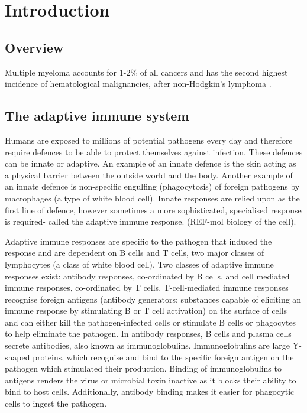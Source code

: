 \chapter{\label{ch:1-intro}Introduction} 


\section{Overview}
Multiple myeloma accounts for 1-2\% of all cancers and has the second highest incidence of hematological malignancies, after non-Hodgkin’s lymphoma \cite{international2003criteria}.

\section{The adaptive immune system}
Humans are exposed to millions of potential pathogens every day and therefore require defences to be able to protect themselves against infection. These defences can be innate or adaptive. An example of an innate defence is the skin acting as a physical barrier between the outside world and the body. Another example of an innate defence is non-specific engulfing (phagocytosis) of foreign pathogens by macrophages (a type of white blood cell). Innate responses are relied upon as the first line of defence, however sometimes a more sophisticated, specialised response is required- called the adaptive immune response. (REF-mol biology of the cell).

Adaptive immune responses are specific to the pathogen that induced the response and are dependent on B cells and T cells, two major classes of lymphocytes (a class of white blood cell).
Two classes of adaptive immune responses exist: antibody responses, co-ordinated by B cells, and cell mediated immune responses, co-ordinated by T cells.
T-cell-mediated immune responses recognise foreign antigens (antibody generators; substances capable of eliciting an immune response by stimulating B or T cell activation) on the surface of cells and can either kill the pathogen-infected cells or stimulate B cells or phagocytes to help eliminate the pathogen.
In antibody responses, B cells and plasma cells secrete antibodies, also known as immunoglobulins.
Immunoglobulins are large Y-shaped proteins, which recognise and bind to the specific foreign antigen on the pathogen which stimulated their production.
Binding of immunoglobulins to antigens renders the virus or microbial toxin inactive as it blocks their ability to bind to host cells.
Additionally, antibody binding makes it easier for phagocytic cells to ingest the pathogen.


